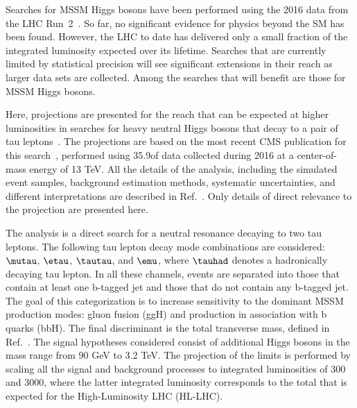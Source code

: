 Searches for MSSM Higgs bosons have been performed using
the 2016 data from the LHC Run~2~\cite{HIG-18-014,HIG-16-018,HIG-17-020}.
So far,
no significant evidence for physics beyond the SM has been found.
However, the LHC to date has delivered only a small fraction of the
integrated luminosity expected over its lifetime.
Searches that are currently limited by statistical precision
will see significant extensions in their reach as larger data sets are collected.
Among the searches that will benefit are those for MSSM Higgs bosons.

Here,
projections are presented for the reach that can be expected at higher luminosities
in searches for heavy neutral Higgs bosons that decay to a pair of tau leptons~\cite{CMS-PAS-FTR-18-017}.
The projections are based on the most recent CMS publication
for this search~\cite{HIG-17-020},
performed using 35.9\fbinv of data collected during 2016
at a center-of-mass energy of 13 TeV.
All the details of the analysis,
including the simulated event samples, background estimation methods,
systematic uncertainties, and different interpretations are described in Ref.~\cite{HIG-17-020}.
Only details of direct relevance to the projection are presented here.

The analysis is a direct search for a neutral resonance
decaying to two tau leptons.
The following tau lepton decay mode combinations are considered: $\mutau$, $\etau$,
$\tautau$, and $\emu$, where $\tauhad$ denotes a hadronically decaying tau lepton.
In all these channels, events are separated into those that contain
at least one b-tagged jet and those that do not contain any b-tagged jet. 
The goal of this categorization is to increase sensitivity to the dominant MSSM production modes: 
gluon fusion (ggH) and production in association with b quarks (bbH).
The final discriminant is the total 
transverse mass, defined in Ref.~\cite{HIG-17-020}.
The signal hypotheses considered consist of additional Higgs
bosons in the mass range from 90 GeV to 3.2 TeV.
The projection of the limits %
is performed by scaling all the signal
and background processes to integrated luminosities
of 300 and 3000\fbinv,
where the latter integrated luminosity corresponds to the total that is
expected for the High-Luminosity LHC (HL-LHC). 

